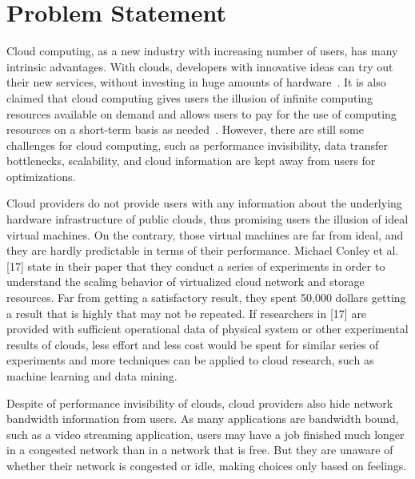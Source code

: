 \section{Problem Statement}
\label{sec:ProblemStatement}





Cloud computing, as a new industry with increasing number of users, has many intrinsic advantages. With clouds, developers with innovative ideas can try out their new services, without investing in huge amounts of hardware~\cite{Armbrust2009}. It is also claimed that cloud computing gives users the illusion of infinite computing resources available on demand and allows users to pay for the use of computing resources on a short-term basis as needed~\cite{Armbrust2009}. However, there are still some challenges for cloud computing, such as performance invisibility, data transfer bottlenecks, scalability, and cloud information are kept away from users for optimizations.

  Cloud providers do not provide users with any information about the underlying hardware infrastructure of public clouds, thus promising users the illusion of ideal virtual machines. On the contrary, those virtual machines are far from ideal, and they are hardly predictable in terms of their performance. Michael Conley et al. [17] state in their paper that they conduct a series of experiments in order to understand the scaling behavior of virtualized cloud network and storage resources. Far from getting a satisfactory result, they spent 50,000 dollars getting a result that is highly that may not be repeated. If researchers in [17] are provided with sufficient operational data of physical system or other experimental results of clouds, less effort and less cost would be spent for similar series of experiments and more techniques can be applied to cloud research, such as machine learning and data mining.

  Despite of performance invisibility of clouds, cloud providers also hide network bandwidth information from users. As many applications are bandwidth bound, such as a video streaming application, users may have a job finished much longer in a congested network than in a network that is free. But they are unaware of whether their network is congested or idle, making choices only based on feelings. 


